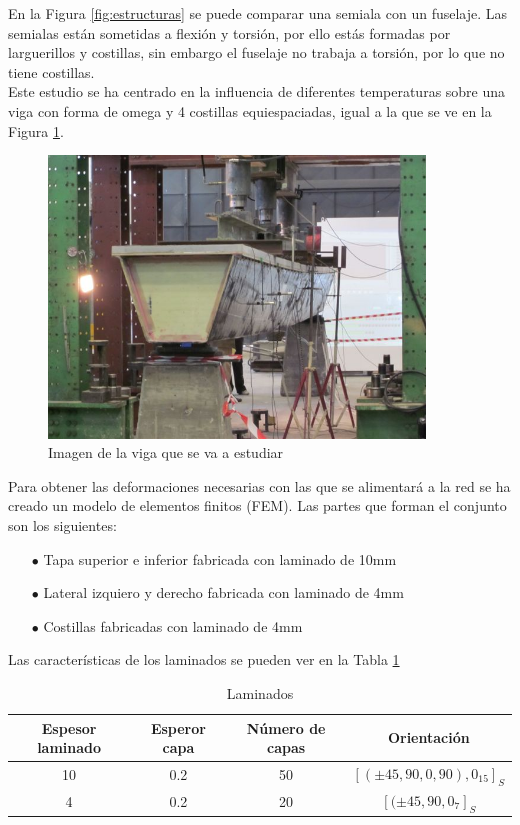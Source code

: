 En la Figura \ref{fig:estructuras} se puede comparar una semiala con un fuselaje. Las semialas están sometidas a flexión y torsión, por ello estás formadas por larguerillos y costillas, sin embargo el fuselaje no trabaja a torsión, por lo que no tiene costillas.\\

Este estudio se ha centrado en la influencia de diferentes temperaturas sobre una viga con forma de omega y 4 costillas equiespaciadas, igual a la que se ve en la Figura \ref{fig:viga_real}. 

\begin{figure}[h!]
    \centering
    \includegraphics[width=100mm]{3/Fotos/Viga_Real.jpg}
    \captionsetup{justification=centering,margin=1.25cm}
    \caption{Imagen de la viga que se va a estudiar}
    \label{fig:viga_real}
\end{figure}     

Para obtener las deformaciones necesarias con las que se alimentará a la red se ha creado un modelo de elementos finitos (FEM). Las partes que forman el conjunto son los siguientes:
\begin{itemize}
    \item[$\bullet$] Tapa superior e inferior fabricada con laminado de 10mm
    \item[$\bullet$] Lateral izquiero y derecho fabricada con laminado de 4mm
    \item[$\bullet$] Costillas fabricadas con laminado de 4mm
\end{itemize}

Las características de los laminados se pueden ver en la Tabla \ref{tab:laminados}

\begin{table}[H]
    \centering
    \begin{tabular}{|c|c|c|c|}
        \hline
        \textbf{Espesor laminado} & \textbf{Esperor capa} & \textbf{Número de capas} & \textbf{Orientación}\\ \hline
        10       & 0.2       & 50         & $[(\pm45, 90, 0, 90), 0_{15}]_{S}$  \\  \hline
        4        & 0.2       & 20         & $[(\pm45, 90, 0_{7}]_{S}$  \\\hline
    \end{tabular}
    \caption{Laminados} 
   \label{tab:laminados}
\end{table}

